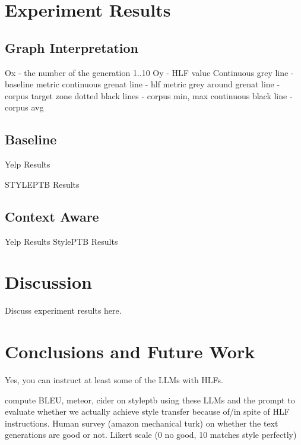 \documentclass[runningheads,a4paper,11pt]{article}
\begin{document}
\section{Experiment Results}

\subsection{Graph Interpretation}

Ox - the number of the generation 1..10
Oy - HLF value
Continuous grey line - baseline metric
continuous grenat line - hlf metric
grey around grenat line - corpus target zone
dotted black lines - corpus min, max
continuous black line - corpus avg

\subsection{Baseline}

Yelp Results

STYLEPTB Results

\subsection{Context Aware}

Yelp Results
StylePTB Results

\section{Discussion}

Discuss experiment results here.

\section{Conclusions and Future Work}

Yes, you can instruct at least some of the LLMs with HLFs.

compute BLEU, meteor, cider on styleptb using these LLMs and the prompt to
evaluate whether we actually achieve style transfer because of/in spite of HLF
instructions.
Human survey (amazon mechanical turk) on whether the text generations are good
or not. Likert scale (0 no good, 10 matches style perfectly)



\end{document}

